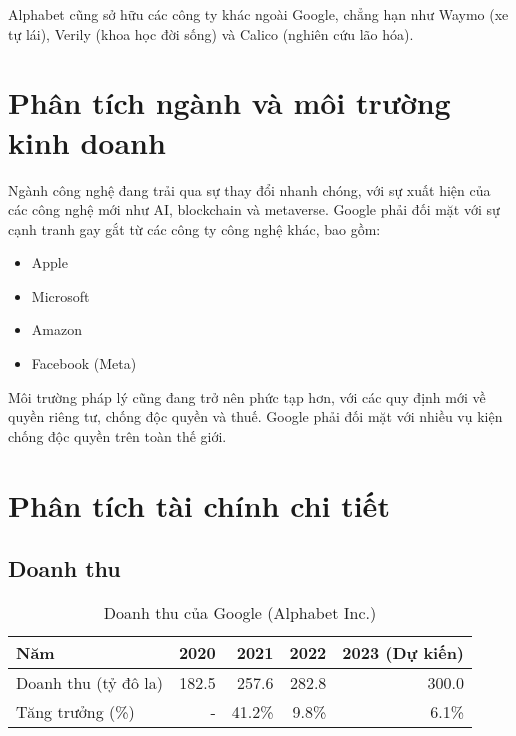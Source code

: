 \documentclass[12pt]{article}
\begin{document}
Alphabet cũng sở hữu các công ty khác ngoài Google, chẳng hạn như Waymo (xe tự lái), Verily (khoa học đời sống) và Calico (nghiên cứu lão hóa).

\section{Phân tích ngành và môi trường kinh doanh}

Ngành công nghệ đang trải qua sự thay đổi nhanh chóng, với sự xuất hiện của các công nghệ mới như AI, blockchain và metaverse.  Google phải đối mặt với sự cạnh tranh gay gắt từ các công ty công nghệ khác, bao gồm:

\begin{itemize}
    \item Apple
    \item Microsoft
    \item Amazon
    \item Facebook (Meta)
\end{itemize}

Môi trường pháp lý cũng đang trở nên phức tạp hơn, với các quy định mới về quyền riêng tư, chống độc quyền và thuế.  Google phải đối mặt với nhiều vụ kiện chống độc quyền trên toàn thế giới.

\section{Phân tích tài chính chi tiết}

\subsection{Doanh thu}

\begin{table}[H]
    \centering
    \begin{tabular}{lrrrr}
        \toprule
        Năm & 2020 & 2021 & 2022 & 2023 (Dự kiến) \\
        \midrule
        Doanh thu (tỷ đô la) & 182.5 & 257.6 & 282.8 & 300.0 \\
        Tăng trưởng (\%) & - & 41.2\% & 9.8\% & 6.1\% \\
        \bottomrule
    \end{tabular}
    \caption{Doanh thu của Google (Alphabet Inc.)}
    \label{tab:revenue}
\end{table}
\end{document}
